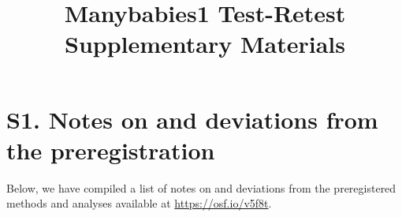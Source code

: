 \documentclass[
  man, donotrepeattitle,floatsintext]{apa6}
\title{Manybabies1 Test-Retest Supplementary Materials}
\author{\phantom{0}}
\date{}
\affiliation{\phantom{0}}
\begin{document}
\maketitle

{
\setcounter{tocdepth}{3}
\tableofcontents
}
\newpage

\hypertarget{s1.-notes-on-and-deviations-from-the-preregistration}{%
\section{S1. Notes on and deviations from the preregistration}\label{s1.-notes-on-and-deviations-from-the-preregistration}}

Below, we have compiled a list of notes on and deviations from the preregistered methods and analyses available at \url{https://osf.io/v5f8t}.
\end{document}
